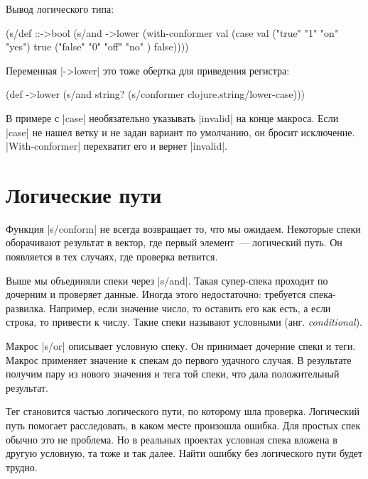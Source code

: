 \noindent
Вывод логического типа:

\begin{english}
  \begin{clojure}
(s/def ::->bool
  (s/and
   ->lower
   (with-conformer val
     (case val
       ("true"  "1" "on"  "yes") true
       ("false" "0" "off" "no" ) false))))
  \end{clojure}
\end{english}

\noindent
Переменная \spverb|->lower| это тоже обертка для приведения регистра:

\begin{english}
  \begin{clojure}
(def ->lower
  (s/and
    string?
    (s/conformer clojure.string/lower-case)))
  \end{clojure}
\end{english}

В примере с \spverb|case| необязательно указывать \spverb|invalid| на конце
макроса. Если \spverb|case| не нашел ветку и не задан вариант по умолчанию, он
бросит исключение. \spverb|With-conformer| перехватит его и вернет
\spverb|invalid|.

\section{Логические пути}

Функция \spverb|s/conform| не всегда возвращает то, что мы ожидаем. Некоторые
спеки оборачивают результат в вектор, где первый элемент~--- логический путь. Он
появляется в тех случаях, где проверка ветвится.

Выше мы объединяли спеки через \spverb|s/and|. Такая супер-спека проходит по
дочерним и проверяет данные. Иногда этого недостаточно: требуется
спека-развилка. Например, если значение число, то оставить его как есть, а если
строка, то привести к числу. Такие спеки называют условными (анг. \emph{conditional}).

Макрос \spverb|s/or| описывает условную спеку. Он принимает дочерние спеки и
теги. Макрос применяет значение к спекам до первого удачного случая. В
результате получим пару из нового значения и тега той спеки, что дала
положительный результат.

Тег становится частью логического пути, по которому шла проверка. Логический
путь помогает расследовать, в каком месте произошла ошибка. Для простых спек
обычно это не проблема. Но в реальных проектах условная спека вложена в другую
условную, та тоже и так далее. Найти ошибку без логического пути будет трудно.

